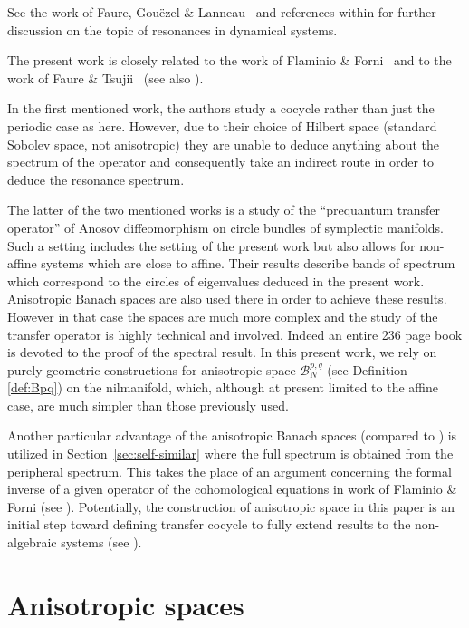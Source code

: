 \documentclass[a4paper,11pt]{amsart}
\theoremstyle{remark}
\newcommand{\cB}{\mathcal{B}} %
\begin{document}
See the work of Faure, Gouëzel \& Lanneau~\cite{FGL19} and references within for further discussion on the topic of resonances in dynamical systems.

The present work is closely related to the work of Flaminio \& Forni~\cite{FF06} and to the work of Faure \& Tsujii~\cite{FT15} (see also \cite{Faure07}).

In the first mentioned work, the authors study a cocycle rather than just the periodic case as here.
However, due to their choice of Hilbert space (standard Sobolev space, not anisotropic) they are unable to deduce anything about the spectrum of the operator and consequently take an indirect route in order to deduce the resonance spectrum.

The latter of the two mentioned works is a study of the ``prequantum transfer operator'' of Anosov diffeomorphism on circle bundles of symplectic manifolds.
Such a setting includes the setting of the present work but also allows for non-affine systems which are close to affine. 
Their results describe bands of spectrum which correspond to the circles of eigenvalues deduced in the present work.
Anisotropic Banach spaces are also used there in order to achieve these results.
However in that case the spaces are much more complex and the study of the transfer operator is highly technical and involved.
Indeed an entire 236 page book is devoted to the proof of the spectral result.
In this present work, we rely on purely geometric constructions for anisotropic space \(\cB^{p,q}_{N}\) (see Definition \ref{def:Bpq}) on the nilmanifold, which, although at present limited to the affine case, are much simpler than those previously used. 

Another particular advantage of the anisotropic Banach spaces (compared to \cite{FF06}) is utilized in Section~\ref{sec:self-similar} where the full spectrum is obtained from the peripheral spectrum. 
This takes the place of an argument concerning the formal inverse of a given operator of the cohomological equations in work of Flaminio \& Forni (see \cite[A.3]{FF06}). 
Potentially, the construction of anisotropic space in this paper is an initial step toward defining transfer cocycle to fully extend results to the non-algebraic systems (see \cite[\S 6]{Forni20}).


\section{Anisotropic spaces}
\label{sec:anisotropic}
\end{document}
